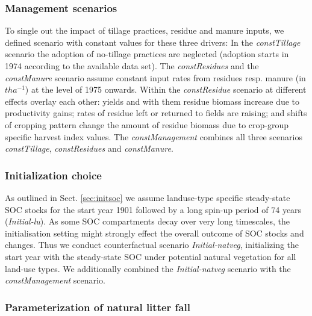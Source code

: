 \documentclass[gc, manuscript]{copernicus}
\begin{document}
\hypertarget{sec:scen_management}{%
\subsubsection{Management scenarios}\label{sec:scen_management}}

To single out the impact of tillage practices, residue and manure inputs, we defined scenario with constant values for these three drivers: In the \textit{constTillage} scenario the adoption of no-tillage practices are neglected (adoption starts in 1974 according to the available data set). The \textit{constResidues} and the \textit{constManure} scenario assume constant input rates from residues resp. manure (in \(\unit{t ha^{-1}}\)) at the level of 1975 onwards. Within the \textit{constResidue} scenario at different effects overlay each other: yields and with them residue biomass increase due to productivity gains; rates of residue left or returned to fields are raising; and shifts of cropping pattern change the amount of residue biomass due to crop-group specific harvest index values. The \textit{constManagement} combines all three scenarios \textit{constTillage}, \textit{constResidues} and \textit{constManure}.

\hypertarget{sec:scen_initial}{%
\subsubsection{Initialization choice}\label{sec:scen_initial}}

As outlined in Sect. \ref{sec:initsoc} we assume landuse-type specific steady-state SOC stocks for the start year 1901 followed by a long spin-up period of 74 years (\textit{Initial-lu}). As some SOC compartments decay over very long timescales, the initialisation setting might strongly effect the overall outcome of SOC stocks and changes. Thus we conduct counterfactual scenario \textit{Initial-natveg}, initializing the start year with the steady-state SOC under potential natural vegetation for all land-use types. We additionally combined the \textit{Initial-natveg} scenario with the \textit{constManagement} scenario.

\hypertarget{sec:scenlitterpnv}{%
\subsubsection{Parameterization of natural litter fall}\label{sec:scenlitterpnv}}
\end{document}
